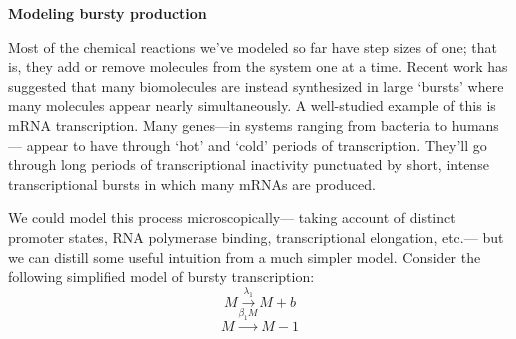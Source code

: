 \documentclass{exam}
\begin{document}
\begin{questions}


\question	\textbf{Modeling bursty production}
 
Most of the chemical reactions we’ve modeled so far have step sizes of one; that is, they add or remove molecules from the system one at a time. Recent work has suggested that many biomolecules are instead synthesized in large ‘bursts’ where many molecules appear nearly simultaneously. A well-studied example of this is mRNA transcription.  Many genes—in systems ranging from bacteria to humans— appear to have through ‘hot’ and ‘cold’ periods of transcription. They’ll go through long periods of transcriptional inactivity punctuated by short, intense transcriptional bursts in which many mRNAs are produced.  
 
We could model this process microscopically— taking account of distinct promoter states, RNA polymerase binding, transcriptional elongation, etc.— but we can distill some useful intuition from a much simpler model. Consider the following simplified model of bursty transcription:  
$$M \xrightarrow{\lambda_1} M + b$$   
$$M \xrightarrow{\beta_1M} M - 1$$
 

\end{questions}
\end{document}
